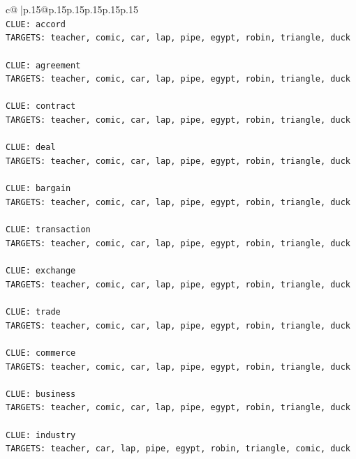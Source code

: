 \documentclass{article}
\begin{document}
{\begin{supertabular}{c@{$\;$}|p{.15\linewidth}@{}p{.15\linewidth}p{.15\linewidth}p{.15\linewidth}p{.15\linewidth}p{.15\linewidth}}
{{{\\ 
\texttt{CLUE: accord} \\
\texttt{TARGETS: teacher, comic, car, lap, pipe, egypt, robin, triangle, duck} \\
\\ 
\texttt{CLUE: agreement} \\
\texttt{TARGETS: teacher, comic, car, lap, pipe, egypt, robin, triangle, duck} \\
\\ 
\texttt{CLUE: contract} \\
\texttt{TARGETS: teacher, comic, car, lap, pipe, egypt, robin, triangle, duck} \\
\\ 
\texttt{CLUE: deal} \\
\texttt{TARGETS: teacher, comic, car, lap, pipe, egypt, robin, triangle, duck} \\
\\ 
\texttt{CLUE: bargain} \\
\texttt{TARGETS: teacher, comic, car, lap, pipe, egypt, robin, triangle, duck} \\
\\ 
\texttt{CLUE: transaction} \\
\texttt{TARGETS: teacher, comic, car, lap, pipe, egypt, robin, triangle, duck} \\
\\ 
\texttt{CLUE: exchange} \\
\texttt{TARGETS: teacher, comic, car, lap, pipe, egypt, robin, triangle, duck} \\
\\ 
\texttt{CLUE: trade} \\
\texttt{TARGETS: teacher, comic, car, lap, pipe, egypt, robin, triangle, duck} \\
\\ 
\texttt{CLUE: commerce} \\
\texttt{TARGETS: teacher, comic, car, lap, pipe, egypt, robin, triangle, duck} \\
\\ 
\texttt{CLUE: business} \\
\texttt{TARGETS: teacher, comic, car, lap, pipe, egypt, robin, triangle, duck} \\
\\ 
\texttt{CLUE: industry} \\
\texttt{TARGETS: teacher, car, lap, pipe, egypt, robin, triangle, comic, duck} \\
\\ 
}}}
\end{supertabular}}
\end{document}
